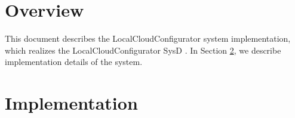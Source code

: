 \documentclass[a4paper]{arrowhead}
\begin{document}
\sloppy

\ArrowheadSetup

\begin{center}
  \vspace*{1cm}
  \huge{\arrowtitle}

  \vspace*{0.2cm}
  \LARGE{\arrowtype}
  \vspace*{1cm}

  \vspace*{\fill}


  \vspace*{1cm}
  \vspace*{\fill}

  \begin{abstract}
    This document describes the implementation of the LocalCloudConfigurator support system of the Eclipse Arrowhead 5.2.2 framework in \texttt{ah5-LocalCloudConfigurator-java} of the primary Java source tree (\texttt{Eclipse-Arrowhead-java}).
  \end{abstract}

  \vspace*{1cm}
\end{center}

\newpage

\tableofcontents
\newpage

\section{Overview}
\label{sec:overview}

This document describes the LocalCloudConfigurator system implementation, which realizes the LocalCloudConfigurator SysD \cite{lcc-sysd}.
In Section \ref{Implementation}, we describe implementation details of the system.

\newpage

\section{Implementation}
\label{Implementation}
\end{document}
